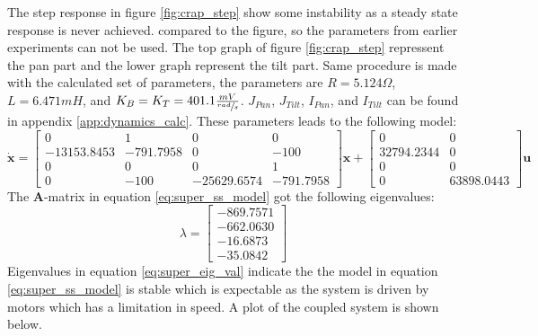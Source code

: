 The step response in figure \ref{fig:crap_step} show some instability as a steady state response is never achieved.  compared to the figure, so the parameters from earlier experiments can not be used. The top graph of figure \ref{fig:crap_step} repressent the pan part and the lower graph represent the tilt part. Same procedure is made with the calculated set of parameters, the parameters are $R = 5.124\Omega$, $L = 6.471mH$, and $K_B = K_T = 401.1 \frac{mV}{\sfrac{rad}{s}}$. $J_{Pan}$, $J_{Tilt}$, $I_{Pan}$, and $I_{Tilt}$ can be found in appendix \ref{app:dynamics_calc}.
These parameters leads to the following model:
\begin{equation}
 \dot{\textbf{x}} =
 \begin{bmatrix}
   0 & 1 & 0 & 0\\
   - 13153.8453 & - 791.7958 & 0 & - 100\\
   0 & 0 & 0 & 1\\
   0 & - 100 & - 25629.6574 & - 791.7958
 \end{bmatrix}
 \textbf{x} +
 \begin{bmatrix}
   0 & 0\\
   32794.2344 & 0\\
   0 & 0\\
   0 & 63898.0443
 \end{bmatrix}
 \textbf{u}\label{eq:super_ss_model}
\end{equation}
The \textbf{A}-matrix in equation \ref{eq:super_ss_model} got the following eigenvalues:
\begin{equation}
 \lambda =
 \begin{bmatrix}
   - 869.7571\\
   - 662.0630\\
   - 16.6873\\
   - 35.0842
 \end{bmatrix}\label{eq:super_eig_val}
\end{equation}
Eigenvalues in equation \ref{eq:super_eig_val} indicate the the model in equation \ref{eq:super_ss_model} is stable which is expectable as the system is driven by motors which has a limitation in speed. A plot of the coupled system is shown below.
